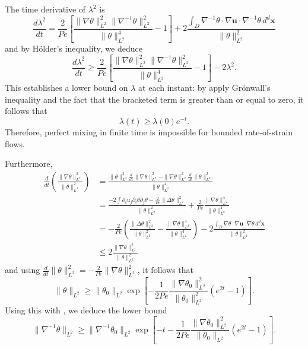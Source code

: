 \documentclass[12pt]{iopart}
\newcommand{\ddt}[1]{\frac{d #1}{dt}}
\newcommand{\hmone}[1]{\|\nabla^{-1} #1\|_{L^{2}}}
\newcommand{\ltwo}[1]{\|#1\|_{L^{2}}}
\newcommand{\hone}[1]{\| \nabla #1\|_{L^{2}}}
\newcommand{\sint}[1]{\int_{D} #1 \, d^{d}\mathbf{x}}
\renewcommand{\vec}[1]{\mathbf{#1}}
\begin{document}
The time derivative of $\lambda^2$ is
%
\begin{equation*}
	\ddt{\lambda^2} = \frac{2}{Pe}
		\left[ 
			\frac{\hone{\theta}^2\hmone{\theta}^2}
					{\ltwo{\theta}^4}  
			- 1
		\right]
		+ 2 \frac{\sint{\nabla^{-1}\theta \cdot \nabla\vec{u} \cdot 
							\nabla^{-1}\theta  }}
					  {\ltwo{\theta}^{2}}
\end{equation*}
and by H\"older's inequality, we deduce
\begin{equation*}
\label{eq:length_ineq_rate-of-strain}
	\ddt{\lambda^2} \geq \frac{2}{Pe} \left[ 
			\frac{\hone{\theta}^2\hmone{\theta}^2}
					{\ltwo{\theta}^4}  
			- 1
		\right] - 2  \lambda^2 .
\end{equation*}
This establishes a lower bound on $\lambda$ at each instant: by apply Gr\"onwall's inequality and the fact that the bracketed term is greater than or equal to zero, it follows that
%
\begin{equation}
\label{eq:exponential_enstrophy}
	\lambda (t) \geq \lambda(0)e^{- t}.
\end{equation}
%
Therefore, perfect mixing in finite time is impossible for bounded rate-of-strain flows.

Furthermore,
%
 \begin{eqnarray*}
\frac{d}{dt}\left(\frac{\|\nabla\theta\|_{L^{2}}^2}{\|\theta\|_{L^{2}}^2}\right) &= \frac{\|\theta\|_{L^{2}}^2\frac{d}{dt}\|\nabla\theta\|_{L^{2}}^2-\|\nabla\theta\|_{L^{2}}^2\frac{d}{dt}\|\theta\|_{L^{2}}^2}{\|\theta\|_{L^{2}}^4}\\
&= \frac{-2\int \partial_{i}u_{j}\partial_{i}\theta\partial_{j}\theta - \frac{2}{Pe} \|\Delta\theta\|_{L^{2}}^2}{\|\theta\|_{L^{2}}^2}+\frac{2}{Pe}\frac{\|\nabla\theta\|_{L^{2}}^4}{\|\theta\|_{L^{2}}^4} \\
&=-\frac{2}{Pe}\left(\frac{\|\Delta\theta\|_{L^{2}}^2}{\|\theta\|_{L^{2}}^2} - \frac{\|\nabla\theta\|_{L^{2}}^4}{\|\theta\|_{L^{2}}^4} \right) - 2\frac{\sint{\nabla\theta \cdot \nabla\vec{u} \cdot \nabla\theta  }}{\|\theta\|_{L^{2}}^2} 
\\
&\leq 2 \frac{\hone{\theta}^2}{\ltwo{\theta}^2}
\end{eqnarray*}
%
and using $\ddt{}\ltwo{\theta}^2 = -\frac{2}{Pe} \hone{\theta}^2$, it follows that
\begin{equation}
\ltwo{\theta}\geq  \ltwo{\theta_{0}}\exp\left[-\frac{1}{2Pe}\frac{\hone{\theta_{0}}^2}{\ltwo{\theta_{0}}^2}\left(e^{2 t} -1\right)\right].
\end{equation}
Using this with , we deduce the lower bound
\begin{equation}
\hmone{\theta} \geq  \hmone{\theta_{0}} \exp\left[- t -\frac{1}{2 Pe}\frac{\hone{\theta_{0}}^2}{\ltwo{\theta_{0}}}\left(e^{2 t} -1\right)\right].
\end{equation}
\end{document}

